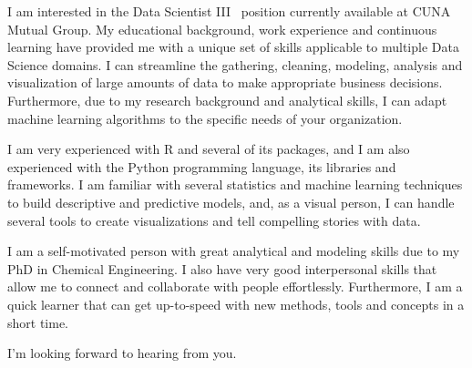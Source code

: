 \documentclass[11pt, letterpaper]{awesome-cv}
\newcommand{\openPosition}{Data Scientist III}
\newcommand{\company}{CUNA Mutual Group}
\begin{document}
\makecvheader[R]


\makelettertitle

\begin{cvletter}

I am interested in the \openPosition~ position currently available at \company. My educational background, work experience and continuous learning have provided me with a unique set of skills applicable to multiple Data Science domains. I can streamline the gathering, cleaning, modeling, analysis and visualization of large amounts of data to make appropriate business decisions. Furthermore, due to my research background and analytical skills, I can adapt machine learning algorithms to the specific needs of your organization.


I am very experienced with R and several of its packages, and I am also experienced with the Python programming language, its libraries and frameworks. I am familiar with several statistics and machine learning techniques to build descriptive and predictive models, and, as a visual person, I can handle several tools to create visualizations and tell compelling stories with data.

I am a self-motivated person with great analytical and modeling skills due to my PhD in Chemical Engineering. I also have very good interpersonal skills that allow me to connect and collaborate with people effortlessly. Furthermore, I am a quick learner that can get up-to-speed with new methods, tools and concepts in a short time.

I'm looking forward to hearing from you.


\end{cvletter}


\makeletterclosing
\end{document}

